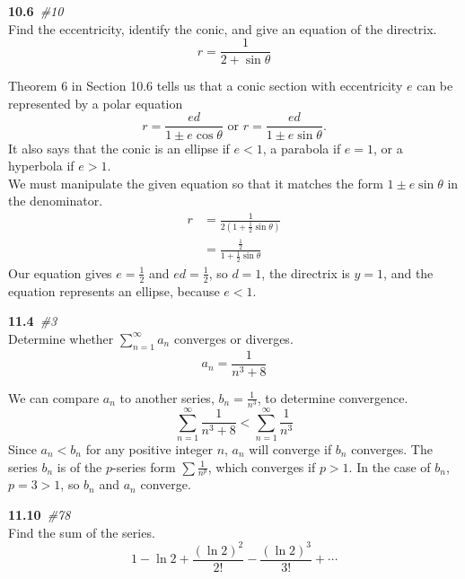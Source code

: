 \documentclass[12pt]{article}
\newcommand{\bfit}[2]{\textbf{#1}\ \textit{#2}}
\newcommand{\double}[0]{\par\null\par}
\renewcommand{\section}[2]{\double\LARGE\bfit{#1}{\##2}\normalsize\\}
\newcommand{\paren}[1]{\left({#1}\right)}
\let\infinity\infty
\begin{document}
\section{10.6}{10}
Find the eccentricity, identify the conic, and give an equation of the directrix.
%
\begin{equation*}
r=\frac{1}{2+\sin\theta}
\end{equation*}\double

Theorem 6 in Section 10.6 tells us that a conic section with eccentricity $e$ can be represented by a polar equation
%
\begin{equation*}
r=\frac{ed}{1\pm{e}\cos\theta}\text{ or }r=\frac{ed}{1\pm{e}\sin\theta}.
\end{equation*}
%
It also says that the conic is an ellipse if $e<1$, a parabola if $e=1$, or a hyperbola if $e>1$. \\
We must manipulate the given equation so that it matches the form $1\pm{e}\sin\theta$ in the denominator.
%
\begin{align*}
r&=\frac{1}{2\paren{1+\frac{1}{2}\sin\theta}} \\
&=\frac{\frac{1}{2}}{1+\frac{1}{2}\sin\theta}
\end{align*}
%
Our equation gives $e=\frac{1}{2}$ and $ed=\frac{1}{2}$, so $d=1$, the directrix is $y=1$, and the equation represents an
ellipse, because $e<1$.

\section{11.4}{3}
Determine whether $\sum_{n=1}^\infinity{a_n}$ converges or diverges.
%
\begin{equation*}
a_n=\frac{1}{n^3+8}
\end{equation*}\double

We can compare $a_n$ to another series, $b_n=\frac{1}{n^3}$, to determine convergence.
%
\begin{equation*}
\sum_{n=1}^\infinity\frac{1}{n^3+8}<\sum_{n=1}^\infinity\frac{1}{n^3}
\end{equation*}
%
Since $a_n<b_n$ for any positive integer $n$, $a_n$ will converge if $b_n$ converges. The series $b_n$ is of the $p$-series form
$\sum\frac{1}{n^p}$, which converges if $p>1$. In the case of $b_n$, $p=3>1$, so $b_n$ and $a_n$ converge.

\section{11.10}{78}
Find the sum of the series.
%
\begin{equation*}
1-\ln{2}+\frac{\paren{\ln{2}}^2}{2!}-\frac{\paren{\ln{2}}^3}{3!}+\cdots
\end{equation*}\double
\end{document}
